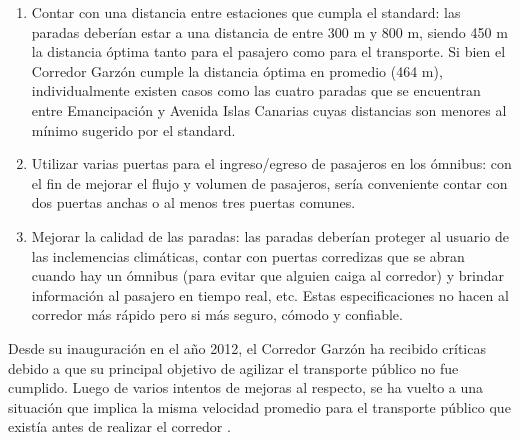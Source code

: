 \begin{enumerate}
	\item Contar con una distancia entre estaciones que cumpla el standard:  las paradas deberían estar a una distancia de entre 300 m y 800 m, siendo 450 m la distancia óptima tanto para el pasajero como para el transporte. Si bien el Corredor Garzón cumple la distancia óptima en promedio (464 m), individualmente existen casos como las cuatro paradas que se encuentran entre Emancipación y Avenida Islas Canarias cuyas distancias son menores al mínimo sugerido por el standard.
	\item Utilizar varias puertas para el ingreso/egreso de pasajeros en los ómnibus: con el fin de mejorar el flujo y volumen de pasajeros, sería conveniente contar con dos puertas anchas o al menos tres puertas comunes.
	\item Mejorar la calidad de las paradas: las paradas deberían proteger al usuario de las inclemencias climáticas, contar con puertas corredizas que se abran cuando hay un ómnibus (para evitar que alguien caiga al corredor) y brindar información al pasajero en tiempo real, etc. Estas especificaciones no hacen al corredor más rápido pero si más seguro, cómodo y confiable.
\end{enumerate}

Desde su inauguración en el año 2012, el Corredor Garzón ha recibido críticas debido a que su principal objetivo de agilizar el transporte público no fue cumplido. Luego de varios intentos de mejoras al respecto, se ha vuelto a una situación que implica la misma velocidad promedio para el transporte público que existía antes de realizar el corredor \citep{olivera2015}.

